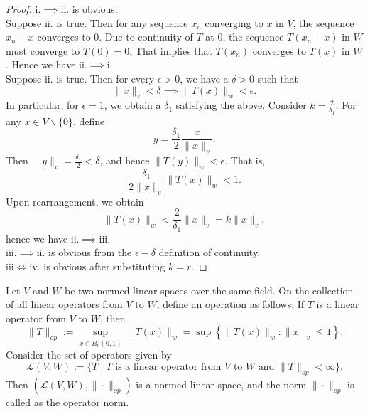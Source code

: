 \begin{proof}
    i.$\implies$ii. is obvious.\\ 
    Suppose ii. is true. Then for any sequence $x_{n}$ converging to $x$ in $V$, the sequence $x_{n}-x$ converges to $0$. Due to continuity of $T$ at $0$, the sequence $T(x_{n}-x)$ in $W$ must converge to $T(0)=0$. That implies that $T(x_{n})$ converges to $T(x)$ in $W$. Hence we have ii.$\implies$i.\\ 
    Suppose ii. is true. Then for every $\epsilon>0$, we have a $\delta>0$ such that $$\|x\|_{v}<\delta\implies\|T(x)\|_{w}<\epsilon.$$
    In particular, for $\epsilon = 1$, we obtain a $\delta_{1}$ satisfying the above. Consider $k=\frac{2}{\delta_{1}}$. For any $x\in V\backslash\{0\}$, define $$y=\frac{\delta_{1}}{2}\frac{x}{\|x\|_{v}}.$$
    Then $\|y\|_{v}=\frac{\delta_{1}}{2}<\delta$, and hence $\|T(y)\|_{w}<\epsilon$. That is, $$\frac{\delta_{1}}{2\|x\|_{v}}\|T(x)\|_{w}<1.$$
    Upon rearrangement, we obtain $$\|T(x)\|_{w}<\frac{2}{\delta_{1}}\|x\|_{v}=k\|x\|_{v},$$
    hence we have ii.$\implies$iii.\\ 
    iii.$\implies$ii. is obvious from the $\epsilon-\delta$ definition of continuity.\\
    iii$\iff$iv. is obvious after substituting $k=r$.
\end{proof}
\vspace{0.4cm}
\begin{eg}
    Let $V$ and $W$ be two normed linear spaces over the same field. On the collection of all linear operators from $V$ to $W$, define an operation as follows:
    If $T$ is a linear operator from $V$ to $W$, then $$\|T\|_{op}:=\sup_{x\in\overline{B}_{v}(0,1)}\|T(x)\|_{w}=\sup\left\{\|T(x)\|_{w} : \|x\|_{v}\leq 1\right\}.$$
    Consider the set of operators given by $$\mathscr{L}(V,W):=\{T\mid T\text{ is a linear operator from }V\text{ to }W\text{ and } \|T\|_{op}<\infty\}.$$
    Then $(\mathscr{L}(V,W),\|\cdot\|_{op})$ is a normed linear space, and the norm $\|\cdot\|_{op}$ is called as the operator norm.
\end{eg}
\vspace{0.4cm}
